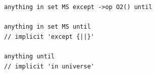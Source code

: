 \begin{figure}[h!]

  \begin{subfigure}[c]{\egtextwidth}
    \begin{lstlisting}[style=Example]
anything in set MS except ->op O2() until

anything in set MS until
// implicit 'except {||}'

anything until
// implicit 'in universe'
\end{lstlisting}
  \end{subfigure}
  \hfill
  \begin{subfigure}[c]{\eggraphicalwidth}
    \gsecaption
    \centering
  \end{subfigure}

\end{figure}

